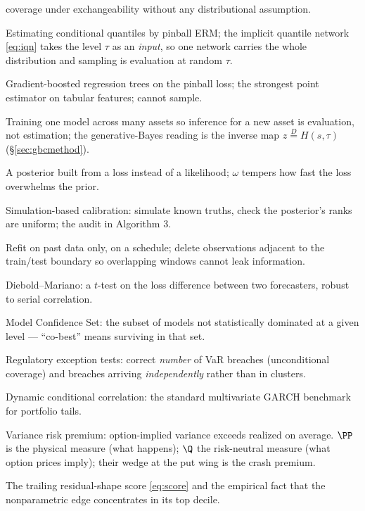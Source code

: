 \begin{description}[leftmargin=1.6em,itemsep=1pt,font=\normalfont\bfseries]
coverage under exchangeability without any distributional assumption.
\item[Quantile regression / IQN] Estimating conditional quantiles by
pinball ERM; the implicit quantile network \eqref{eq:iqn} takes the
level $\tau$ as an \emph{input}, so one network carries the whole
distribution and sampling is evaluation at random $\tau$.
\item[GBM (trees)] Gradient-boosted regression trees on the pinball
loss; the strongest point estimator on tabular features; cannot sample.
\item[Amortization] Training one model across many assets so inference
for a new asset is evaluation, not estimation; the generative-Bayes
reading is the inverse map $z \overset{D}{=} H(s,\tau)$
(\S\ref{sec:gbcmethod}).
\item[Gibbs / generalized-Bayes posterior] A posterior built from a
loss instead of a likelihood; $\omega$ tempers how
fast the loss overwhelms the prior.
\item[SBC] Simulation-based calibration: simulate known truths, check
the posterior's ranks are uniform; the audit in Algorithm 3.
\item[Walk-forward, purge, embargo] Refit on past data only, on a
schedule; delete observations adjacent to the train/test boundary so
overlapping windows cannot leak information.
\item[DM test] Diebold--Mariano: a $t$-test on the loss difference
between two forecasters, robust to serial correlation.
\item[MCS] Model Confidence Set: the subset of models not
statistically dominated at a given level --- ``co-best'' means surviving
in that set.
\item[Kupiec / Christoffersen] Regulatory exception tests: correct
\emph{number} of VaR breaches (unconditional coverage) and breaches
arriving \emph{independently} rather than in clusters.
\item[DCC] Dynamic conditional correlation: the standard multivariate
GARCH benchmark for portfolio tails.
\item[VRP; $\PP$ vs.\ $\Q$] Variance risk premium: option-implied
variance exceeds realized on average. $\PP$ is the physical measure
(what happens); $\Q$ the risk-neutral measure (what option prices
imply); their wedge at the put wing is the crash premium.
\item[Misspecification frontier] The trailing residual-shape score
\eqref{eq:score} and the empirical fact that the nonparametric edge
concentrates in its top decile.
\end{description}



